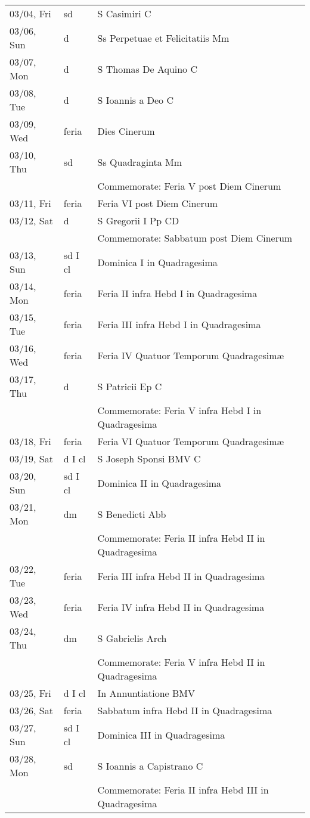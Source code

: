 \documentclass{article}
\begin{document}
\begin{longtable}{ l l l }
03/04, Fri & sd & S Casimiri C\\
03/06, Sun & d & Ss Perpetuae et Felicitatiis Mm\\
03/07, Mon & d & S Thomas De Aquino C\\
03/08, Tue & d & S Ioannis a Deo C\\
03/09, Wed & feria & Dies Cinerum\\
03/10, Thu & sd & Ss Quadraginta Mm\\
 & & Commemorate: Feria V post Diem Cinerum\\
03/11, Fri & feria & Feria VI post Diem Cinerum\\
03/12, Sat & d & S Gregorii I Pp CD\\
 & & Commemorate: Sabbatum post Diem Cinerum\\
03/13, Sun & sd I cl & Dominica I in Quadragesima\\
03/14, Mon & feria & Feria II infra Hebd I in Quadragesima\\
03/15, Tue & feria & Feria III infra Hebd I in Quadragesima\\
03/16, Wed & feria & Feria IV Quatuor Temporum Quadragesimæ\\
03/17, Thu & d & S Patricii Ep C\\
 & & Commemorate: Feria V infra Hebd I in Quadragesima\\
03/18, Fri & feria & Feria VI Quatuor Temporum Quadragesimæ\\
03/19, Sat & d I cl & S Joseph Sponsi BMV C\\
03/20, Sun & sd I cl & Dominica II in Quadragesima\\
03/21, Mon & dm & S Benedicti Abb\\
 & & Commemorate: Feria II infra Hebd II in Quadragesima\\
03/22, Tue & feria & Feria III infra Hebd II in Quadragesima\\
03/23, Wed & feria & Feria IV infra Hebd II in Quadragesima\\
03/24, Thu & dm & S Gabrielis Arch\\
 & & Commemorate: Feria V infra Hebd II in Quadragesima\\
03/25, Fri & d I cl & In Annuntiatione BMV\\
03/26, Sat & feria & Sabbatum infra Hebd II in Quadragesima\\
03/27, Sun & sd I cl & Dominica III in Quadragesima\\
03/28, Mon & sd & S Ioannis a Capistrano C\\
 & & Commemorate: Feria II infra Hebd III in Quadragesima\\

\end{longtable}
\end{document}
